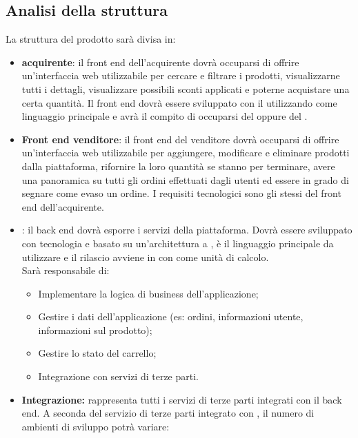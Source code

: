 \subsection{Analisi della struttura}
La struttura del prodotto sarà divisa in:
\begin{itemize}
    \item \textbf{ acquirente}: il front end dell'acquirente dovrà occuparsi di offrire un'interfaccia web utilizzabile per cercare e filtrare i prodotti, visualizzarne tutti i dettagli, visualizzare possibili sconti applicati e poterne acquistare una certa quantità. Il front end dovrà essere sviluppato con il   utilizzando come linguaggio principale  e avrà il compito di occuparsi del  oppure del .
    \item \textbf{Front end venditore}: il front end del venditore dovrà occuparsi di offrire un'interfaccia web utilizzabile per aggiungere, modificare e eliminare prodotti dalla piattaforma, rifornire la loro quantità se stanno per terminare, avere una panoramica su tutti gli ordini effettuati dagli utenti ed essere in grado di segnare come evaso un ordine. I requisiti tecnologici sono gli stessi del front end dell'acquirente.
    \item \textbf{}: il back end dovrà esporre i servizi della piattaforma. Dovrà essere sviluppato con tecnologia  e basato su un'architettura a ,  è il linguaggio principale da utilizzare e il rilascio avviene in  con  come unità di calcolo.\\
    Sarà responsabile di:
    \begin{itemize}
        \item Implementare la logica di business dell'applicazione;
        \item Gestire i dati dell'applicazione (es: ordini, informazioni utente, informazioni sul prodotto);
        \item Gestire lo stato del carrello;
        \item Integrazione con servizi di terze parti.
    \end{itemize}
    \item \textbf{Integrazione:} rappresenta tutti i servizi di terze parti integrati con il back end. A seconda del servizio di terze parti integrato con \NomeProgetto{}, il numero di ambienti di sviluppo potrà variare:
    \begin{itemize}

\end{itemize}
\end{itemize}
